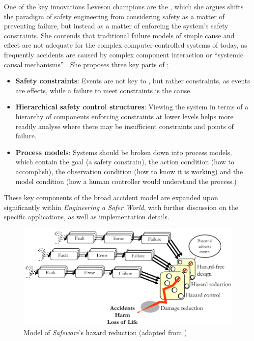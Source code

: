 \documentclass{cshonours}
\begin{document}
One of the key innovations Leveson champions are the \stamp, which she argues shifts the paradigm of safety engineering from considering safety as a matter of preventing failure, but instead as a matter of enforcing the system's safety constraints. She contends that traditional failure models of simple cause and effect are not adequate for the complex computer controlled systems of today, as frequently accidents are caused by complex component interaction or ``systemic causal mechanisms'' \cite[pp.~73--5]{saferworld}. She proposes three key parts of \stamp; 
\begin{itemize}
  \item \textbf{Safety constraints}: Events are not key to \stamp, but rather constraints, as events are effects, while a failure to meet constraints is the cause.
  \item \textbf{Hierarchical safety control structures}: Viewing the system in terms of a hierarchy of components enforcing constraints at lower levels helps more readily analyse where there may be insufficient constraints and points of failure.
  \item \textbf{Process models}: Systems should be broken down into process models, which contain the goal (a safety constrain), the action condition (how to accomplish), the observation condition (how to know it is working) and the model condition (how a human controller would understand the process.)
\end{itemize}

These key components of the broad \stamp accident model are expanded upon significantly within \textit{Engineering a Safer World}, with further discussion on the specific applications, as well as implementation details.

\begin{figure}
 \includegraphics[width=\textwidth]{figs/besnardmodified.pdf}
 \caption{Model of \textit{Safeware}'s hazard reduction (adapted from \cite[fig.~6]{besnard2003human})}
 \label{fig:besnardmodel}
\end{figure}
\end{document}
